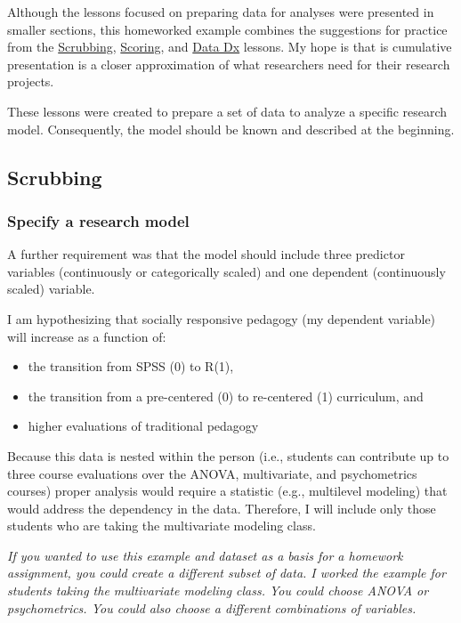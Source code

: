 \documentclass[
  11pt,
]{book}
\providecommand{\tightlist}{%
  \setlength{\itemsep}{0pt}\setlength{\parskip}{0pt}}
\begin{document}
Although the lessons focused on preparing data for analyses were presented in smaller sections, this homeworked example combines the suggestions for practice from the \protect\hyperlink{scrub}{Scrubbing}, \protect\hyperlink{scrub}{Scoring}, and \protect\hyperlink{datadx}{Data Dx} lessons. My hope is that is cumulative presentation is a closer approximation of what researchers need for their research projects.

These lessons were created to prepare a set of data to analyze a specific research model. Consequently, the model should be known and described at the beginning.

\hypertarget{scrubbing-1}{%
\subsection{Scrubbing}\label{scrubbing-1}}

\hypertarget{specify-a-research-model}{%
\subsubsection*{Specify a research model}\label{specify-a-research-model}}


A further requirement was that the model should include three predictor variables (continuously or categorically scaled) and one dependent (continuously scaled) variable.

I am hypothesizing that socially responsive pedagogy (my dependent variable) will increase as a function of:

\begin{itemize}
\tightlist
\item
  the transition from SPSS (0) to R(1),
\item
  the transition from a pre-centered (0) to re-centered (1) curriculum, and
\item
  higher evaluations of traditional pedagogy
\end{itemize}

Because this data is nested within the person (i.e., students can contribute up to three course evaluations over the ANOVA, multivariate, and psychometrics courses) proper analysis would require a statistic (e.g., multilevel modeling) that would address the dependency in the data. Therefore, I will include only those students who are taking the multivariate modeling class.

\emph{If you wanted to use this example and dataset as a basis for a homework assignment, you could create a different subset of data. I worked the example for students taking the multivariate modeling class. You could choose ANOVA or psychometrics. You could also choose a different combinations of variables.}
\end{document}

